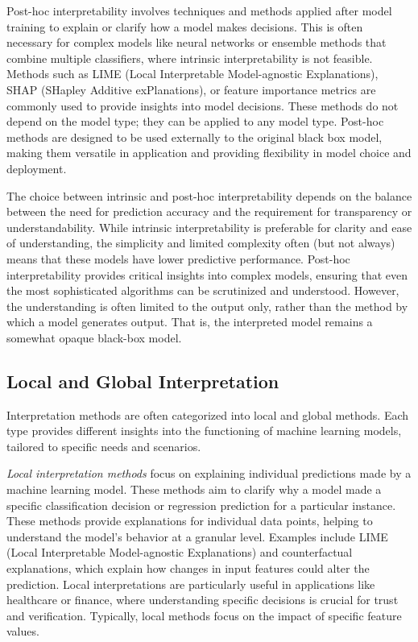 Post-hoc interpretability involves techniques and methods applied after model training to explain or clarify how a model makes decisions. This is often necessary for complex models like neural networks or ensemble methods that combine multiple classifiers, where intrinsic interpretability is not feasible. Methods such as LIME (Local Interpretable Model-agnostic Explanations), SHAP (SHapley Additive exPlanations), or feature importance metrics are commonly used to provide insights into model decisions. These methods do not depend on the model type; they can be applied to any model type. Post-hoc methods are designed to be used externally to the original black box model, making them versatile in application and providing flexibility in model choice and deployment.

The choice between intrinsic and post-hoc interpretability depends on the balance between the need for prediction accuracy and the requirement for transparency or understandability. While intrinsic interpretability is preferable for clarity and ease of understanding, the simplicity and limited complexity often (but not always) means that these models have lower predictive performance. Post-hoc interpretability provides critical insights into complex models, ensuring that even the most sophisticated algorithms can be scrutinized and understood. However, the understanding is often limited to the output only, rather than the method by which a model generates output. That is, the interpreted model remains a somewhat opaque black-box model.

\subsection*{Local and Global Interpretation}

Interpretation methods are often categorized into local and global methods. Each type provides different insights into the functioning of machine learning models, tailored to specific needs and scenarios.

\emph{Local interpretation methods} focus on explaining individual predictions made by a machine learning model. These methods aim to clarify why a model made a specific classification decision or regression prediction for a particular instance. These methods provide explanations for individual data points, helping to understand the model's behavior at a granular level. Examples include LIME (Local Interpretable Model-agnostic Explanations) and counterfactual explanations, which explain how changes in input features could alter the prediction. Local interpretations are particularly useful in applications like healthcare or finance, where understanding specific decisions is crucial for trust and verification. Typically, local methods focus on the impact of specific feature values.

